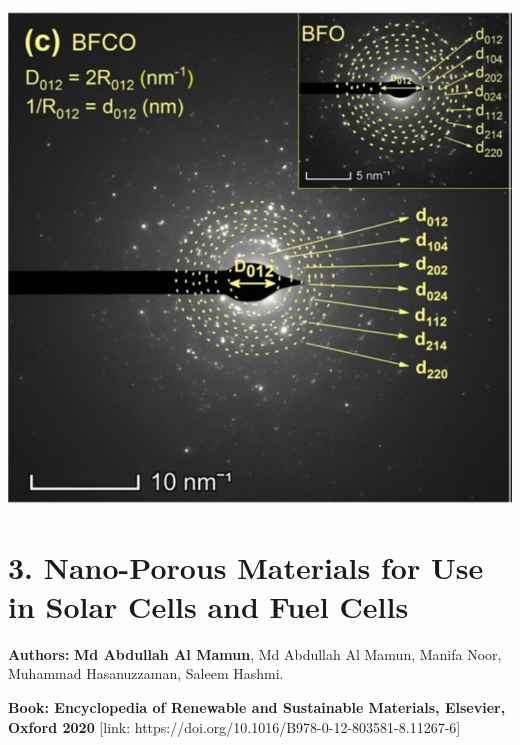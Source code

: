 \documentclass[a4paper,20pt]{article}
\begin{document}
    \begin{minipage}{0.4\linewidth}\begin{flushright}
    	 	\includegraphics[width=0.85\linewidth]{jms}\\
    	 	
    	\end{flushright}\end{minipage}

\vspace{20pt}

\section{\textbf{3. Nano-Porous Materials for Use in Solar Cells and Fuel Cells}}

\textbf{Authors:} \textbf{Md Abdullah Al Mamun}, Md Abdullah Al Mamun, Manifa Noor, Muhammad Hasanuzzaman, Saleem Hashmi. \\ \vspace{3pt}

\textbf{Book: Encyclopedia of Renewable and Sustainable Materials, Elsevier, Oxford 2020} [link: https://doi.org/10.1016/B978-0-12-803581-8.11267-6] \\ \vspace{8pt}
\end{document}
